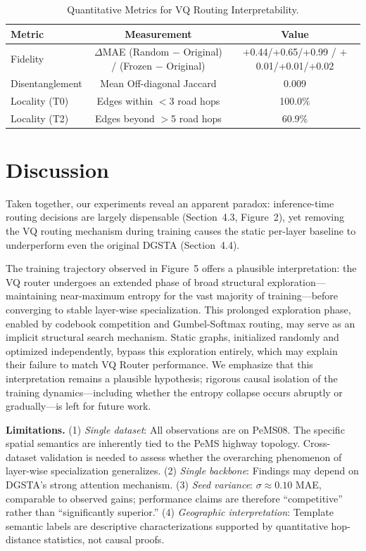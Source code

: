\documentclass[journal]{IEEEtran}
\begin{document}
\begin{table}[h]
\centering
\caption{Quantitative Metrics for VQ Routing Interpretability.}
\label{tab:xai}
\begin{tabular}{lcc}
\toprule
Metric & Measurement & Value \\
\midrule
Fidelity & $\Delta$MAE (Random $-$ Original) / (Frozen $-$ Original) & $+$0.44/+0.65/+0.99 / $+$0.01/+0.01/+0.02 \\
Disentanglement & Mean Off-diagonal Jaccard & 0.009 \\[4pt]
Locality (T0) & Edges within $<$3 road hops & 100.0\% \\
Locality (T2) & Edges beyond $>$5 road hops & 60.9\% \\
\bottomrule
\end{tabular}
\end{table}

\section{Discussion}

Taken together, our experiments reveal an apparent paradox: inference-time routing decisions are largely dispensable (Section~4.3, Figure~2), yet removing the VQ routing mechanism during training causes the static per-layer baseline to underperform even the original DGSTA (Section~4.4).

The training trajectory observed in Figure~5 offers a plausible interpretation: the VQ router undergoes an extended phase of broad structural exploration---maintaining near-maximum entropy for the vast majority of training---before converging to stable layer-wise specialization. This prolonged exploration phase, enabled by codebook competition and Gumbel-Softmax routing, may serve as an implicit structural search mechanism. Static graphs, initialized randomly and optimized independently, bypass this exploration entirely, which may explain their failure to match VQ Router performance. We emphasize that this interpretation remains a plausible hypothesis; rigorous causal isolation of the training dynamics---including whether the entropy collapse occurs abruptly or gradually---is left for future work.

\textbf{Limitations.} (1) \emph{Single dataset}: All observations are on PeMS08. The specific spatial semantics are inherently tied to the PeMS highway topology. Cross-dataset validation is needed to assess whether the overarching phenomenon of layer-wise specialization generalizes. (2) \emph{Single backbone}: Findings may depend on DGSTA's strong attention mechanism. (3) \emph{Seed variance}: $\sigma\approx 0.10$ MAE, comparable to observed gains; performance claims are therefore ``competitive'' rather than ``significantly superior.'' (4) \emph{Geographic interpretation}: Template semantic labels are descriptive characterizations supported by quantitative hop-distance statistics, not causal proofs.
\end{document}

